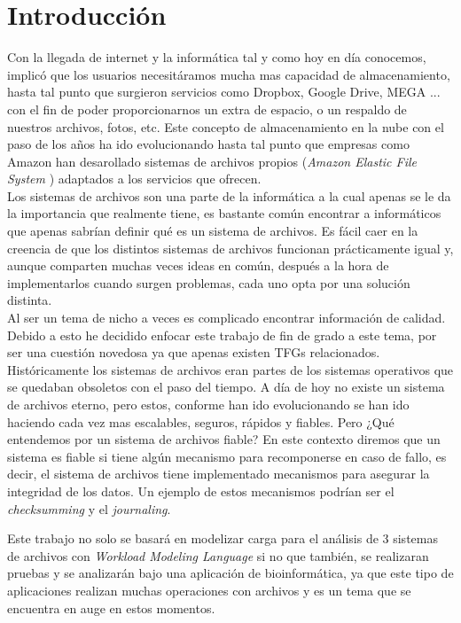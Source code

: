 \cleardoublepage
\clearpage{}
\chapter{Introducción}
Con la llegada de internet y la informática tal y como hoy en día conocemos, implicó que los usuarios necesitáramos mucha mas capacidad de almacenamiento, hasta tal punto que surgieron servicios como Dropbox, Google Drive, MEGA ... con el fin de poder proporcionarnos un extra de espacio, o un respaldo de nuestros archivos, fotos, etc. Este concepto de almacenamiento en la nube con el paso de los años ha ido evolucionando hasta tal punto que empresas como Amazon han desarollado sistemas de archivos propios (\textit{Amazon Elastic File System} \cite{amazon})  adaptados a los servicios que ofrecen.\\

Los sistemas de archivos son una parte de la informática a la cual apenas se le da la importancia que realmente tiene, es bastante común encontrar a informáticos que apenas sabrían definir qué es un sistema de archivos. Es fácil caer en la creencia de que los distintos sistemas de archivos funcionan prácticamente igual y, aunque comparten muchas veces ideas en común, después a la hora de implementarlos cuando surgen problemas, cada uno opta por una solución distinta.\\

Al ser un tema de nicho a veces es complicado encontrar información de calidad. Debido a esto he decidido enfocar este trabajo de fin de grado a este tema, por ser una cuestión novedosa ya que apenas existen TFGs relacionados.\\

Históricamente los sistemas de archivos eran partes de los sistemas operativos que se quedaban obsoletos con el paso del tiempo. A día de hoy no existe un sistema de archivos eterno, pero estos, conforme han ido evolucionando se han ido haciendo cada vez mas escalables, seguros, rápidos y fiables. Pero ¿Qué entendemos por un sistema de archivos fiable? En este contexto diremos que un sistema es fiable si tiene algún mecanismo para recomponerse en caso de fallo, es decir, el sistema de archivos tiene implementado mecanismos para asegurar la integridad de los datos. Un ejemplo de estos mecanismos podrían ser el \textit{checksumming} y el \textit{journaling}.\\

\newpage

Este trabajo no solo se basará en modelizar carga para el análisis de 3 sistemas de archivos con \textit{Workload Modeling Language} si no que también, se realizaran pruebas y se analizarán bajo una aplicación de bioinformática, ya que este tipo de aplicaciones realizan muchas operaciones con archivos y es un tema que se encuentra en auge en estos momentos.



